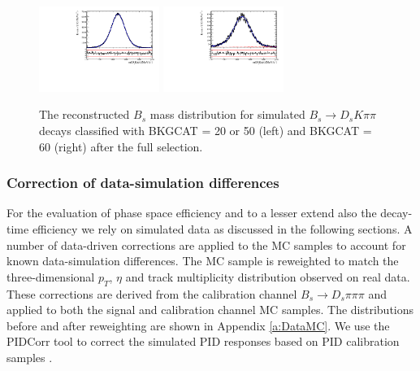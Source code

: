 \begin{figure}[h]
\centering
\includegraphics[height=!,width=0.35\textwidth]{figs/MassFit/signalMC_pull.pdf}
\includegraphics[height=!,width=0.35\textwidth]{figs/MassFit/signalMC_ghost_pull.pdf}


\caption{\small The reconstructed $B_s$ mass distribution for simulated $B_s \to D_s K \pi \pi$  %
decays classified with \textsf{BKGCAT} = 20 or 50 (left) and \textsf{BKGCAT} = 60 (right) after the full selection. }
\label{fig:}
\end{figure}


\subsubsection{Correction of data-simulation differences}

For the evaluation of phase space efficiency and to a lesser extend also the decay-time efficiency we rely on simulated data 
as discussed in the following sections.
A number of data-driven corrections are applied to the MC samples to account for known data-simulation differences.
The MC sample is reweighted to match the three-dimensional $p_T$, $\eta$ and track multiplicity distribution observed on real data.
These corrections are derived from the calibration channel $B_s\to D_s \pi\pi\pi$ and applied to both the signal and calibration channel MC samples.
The distributions before and after reweighting are shown in Appendix \ref{a:DataMC}.
We use the \textsf{PIDCorr} tool to correct the simulated PID responses based on PID calibration samples \cite{LHCb-INT-2017-007}.

